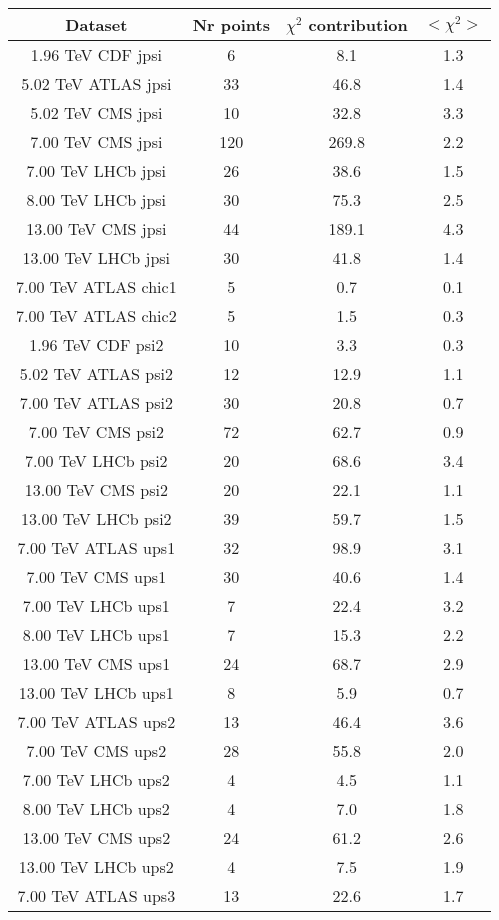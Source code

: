 \begin{table}[h!]
\centering
\begin{tabular}{c|c|c|c}
Dataset & Nr points & $\chi^2$ contribution & $<\chi^2>$ \\
\hline
1.96 TeV CDF jpsi & 6 & 8.1 & 1.3 \\
5.02 TeV ATLAS jpsi & 33 & 46.8 & 1.4 \\
5.02 TeV CMS jpsi & 10 & 32.8 & 3.3 \\
7.00 TeV CMS jpsi & 120 & 269.8 & 2.2 \\
7.00 TeV LHCb jpsi & 26 & 38.6 & 1.5 \\
8.00 TeV LHCb jpsi & 30 & 75.3 & 2.5 \\
13.00 TeV CMS jpsi & 44 & 189.1 & 4.3 \\
13.00 TeV LHCb jpsi & 30 & 41.8 & 1.4 \\
7.00 TeV ATLAS chic1 & 5 & 0.7 & 0.1 \\
7.00 TeV ATLAS chic2 & 5 & 1.5 & 0.3 \\
1.96 TeV CDF psi2 & 10 & 3.3 & 0.3 \\
5.02 TeV ATLAS psi2 & 12 & 12.9 & 1.1 \\
7.00 TeV ATLAS psi2 & 30 & 20.8 & 0.7 \\
7.00 TeV CMS psi2 & 72 & 62.7 & 0.9 \\
7.00 TeV LHCb psi2 & 20 & 68.6 & 3.4 \\
13.00 TeV CMS psi2 & 20 & 22.1 & 1.1 \\
13.00 TeV LHCb psi2 & 39 & 59.7 & 1.5 \\
7.00 TeV ATLAS ups1 & 32 & 98.9 & 3.1 \\
7.00 TeV CMS ups1 & 30 & 40.6 & 1.4 \\
7.00 TeV LHCb ups1 & 7 & 22.4 & 3.2 \\
8.00 TeV LHCb ups1 & 7 & 15.3 & 2.2 \\
13.00 TeV CMS ups1 & 24 & 68.7 & 2.9 \\
13.00 TeV LHCb ups1 & 8 & 5.9 & 0.7 \\
7.00 TeV ATLAS ups2 & 13 & 46.4 & 3.6 \\
7.00 TeV CMS ups2 & 28 & 55.8 & 2.0 \\
7.00 TeV LHCb ups2 & 4 & 4.5 & 1.1 \\
8.00 TeV LHCb ups2 & 4 & 7.0 & 1.8 \\
13.00 TeV CMS ups2 & 24 & 61.2 & 2.6 \\
13.00 TeV LHCb ups2 & 4 & 7.5 & 1.9 \\
7.00 TeV ATLAS ups3 & 13 & 22.6 & 1.7 \\

\end{tabular}
\end{table}
